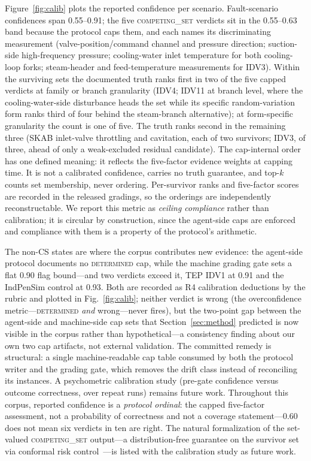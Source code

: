 \documentclass[preprint,10pt]{elsarticle}
\begin{document}
Figure~\ref{fig:calib} plots the reported confidence per scenario. Fault-scenario confidences span 0.55--0.91; the five \mbox{\textsc{competing\_set}} verdicts sit in the 0.55--0.63 band because the protocol caps them, and each names its discriminating measurement (valve-position/command channel and pressure direction; suction-side high-frequency pressure; cooling-water inlet temperature for both cooling-loop forks; steam-header and feed-temperature measurements for IDV3). Within the surviving sets the documented truth ranks first in two of the five capped verdicts at family or branch granularity (IDV4; IDV11 at branch level, where the cooling-water-side disturbance heads the set while its specific random-variation form ranks third of four behind the steam-branch alternative); at form-specific granularity the count is one of five. The truth ranks second in the remaining three (SKAB inlet-valve throttling and cavitation, each of two survivors; IDV3, of three, ahead of only a weak-excluded residual candidate). The cap-internal order has one defined meaning: it reflects the five-factor evidence weights at capping time. It is not a calibrated confidence, carries no truth guarantee, and top-$k$ counts set membership, never ordering. Per-survivor ranks and five-factor scores are recorded in the released gradings, so the orderings are independently reconstructable. We report this metric as \emph{ceiling compliance} rather than calibration; it is circular by construction, since the agent-side caps are enforced and compliance with them is a property of the protocol's arithmetic.

The non-CS states are where the corpus contributes new evidence: the agent-side protocol documents no \mbox{\textsc{determined}} cap, while the machine grading gate sets a flat 0.90 flag bound---and two verdicts exceed it, TEP IDV1 at 0.91 and the IndPenSim control at 0.93. Both are recorded as R4 calibration deductions by the rubric and plotted in Fig.~\ref{fig:calib}; neither verdict is wrong (the overconfidence metric---\mbox{\textsc{determined}} \emph{and} wrong---never fires), but the two-point gap between the agent-side and machine-side cap sets that Section~\ref{sec:method} predicted is now visible in the corpus rather than hypothetical---a consistency finding about our own two cap artifacts, not external validation. The committed remedy is structural: a single machine-readable cap table consumed by both the protocol writer and the grading gate, which removes the drift class instead of reconciling its instances. A psychometric calibration study (pre-gate confidence versus outcome correctness, over repeat runs) remains future work. Throughout this corpus, reported confidence is a \emph{protocol ordinal}: the capped five-factor assessment, not a probability of correctness and not a coverage statement---$0.60$ does not mean six verdicts in ten are right. The natural formalization of the set-valued \mbox{\textsc{competing\_set}} output---a distribution-free guarantee on the survivor set via conformal risk control~\cite{angelopoulos2023conformal}---is listed with the calibration study as future work.
\end{document}
